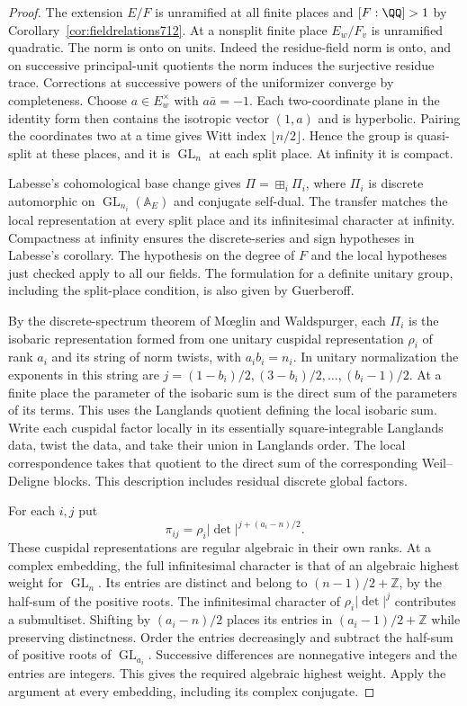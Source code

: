 \documentclass[a4paper,11pt]{article}
\theoremstyle{definition}
\theoremstyle{remark}
\newcommand{\ZZ}{\mathbb Z}\newcommand{\ord}{\operatorname{ord}}
\numberwithin{equation}{section}
\newcommand{\GL}{\operatorname{GL}}
\begin{document}
\begin{proof}
The extension \(E/F\) is unramified at all finite places and
\([F:\QQ]>1\) by Corollary~\ref{cor:fieldrelations712}.
At a nonsplit finite place \(E_w/F_v\) is unramified quadratic.
The norm is onto on units. Indeed the residue-field norm is
onto, and on successive principal-unit quotients the norm
induces the surjective residue trace. Corrections at successive
powers of the uniformizer converge by completeness. Choose
\(a\in E_w^\times\) with \(a\bar a=-1\). Each two-coordinate
plane in the identity form then contains the isotropic vector
\((1,a)\) and is hyperbolic. Pairing the coordinates two at
a time gives Witt index \(\lfloor n/2\rfloor\). Hence the group
is quasi-split at these places, and it is \(\GL_n\) at each
split place. At infinity it is compact.

Labesse's cohomological base change gives
\(\Pi=\boxplus_i\Pi_i\), where \(\Pi_i\) is discrete automorphic
on \(\GL_{n_i}(\mathbb A_E)\) and conjugate self-dual.
The transfer matches the local representation at every split
place and its infinitesimal character at infinity. Compactness
at infinity ensures the discrete-series and sign hypotheses
in Labesse's corollary. The hypothesis on the degree of \(F\)
and the local hypotheses just checked apply to all our fields.
The formulation for a definite unitary group, including the
split-place condition, is also given by Guerberoff.
~\cite[Cor.~5.3]{IX-VII-VII-labesse722}\cite[Thm.~2.2]{IX-VII-VII-guerberoff722}

By the discrete-spectrum theorem of M{\oe}glin and Waldspurger,
each \(\Pi_i\) is the isobaric representation formed from one
unitary cuspidal representation \(\rho_i\) of rank \(a_i\)
and its string of norm twists, with \(a_i b_i=n_i\).
In unitary normalization the exponents in this string are
\(j=(1-b_i)/2,(3-b_i)/2,\ldots,(b_i-1)/2\).
At a finite place the parameter of the isobaric sum is the
direct sum of the parameters of its terms. This uses the
Langlands quotient defining the local isobaric sum. Write
each cuspidal factor locally in its essentially square-integrable
Langlands data, twist the data, and take their union in
Langlands order. The local correspondence takes that quotient
to the direct sum of the corresponding Weil--Deligne blocks.
This description includes residual discrete global factors.
~\cite{IX-VII-VII-mw722}

For each \(i,j\) put
\[
       \pi_{ij}=\rho_i|\det|^{j+(a_i-n)/2}.
\]
These cuspidal representations are regular algebraic in their
own ranks. At a complex embedding, the full infinitesimal
character is that of an algebraic highest weight for \(\GL_n\).
Its entries are distinct and belong to \((n-1)/2+\ZZ\), by
the half-sum of the positive roots. The infinitesimal character
of \(\rho_i|\det|^j\) contributes a submultiset. Shifting by
\((a_i-n)/2\) places its entries in \((a_i-1)/2+\ZZ\) while
preserving distinctness. Order the entries decreasingly and
subtract the half-sum of positive roots of \(\GL_{a_i}\).
Successive differences are nonnegative integers and the entries
are integers. This gives the required algebraic highest weight.
Apply the argument at every embedding, including its complex
conjugate.


\end{proof}
\end{document}
